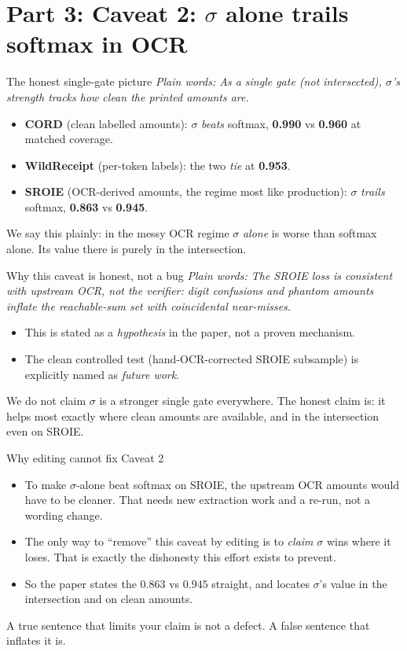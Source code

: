 \documentclass[aspectratio=169]{beamer}
\newcommand{\keybox}[1]{\begin{center}\colorbox{grey!15}{\parbox{0.92\linewidth}{\centering #1}}\end{center}}
\newcommand{\plain}[1]{\textit{\textcolor{sig}{Plain words:} #1}}
\begin{document}
\section{Part 3: Caveat 2: $\sigma$ alone trails softmax in OCR}
\begin{frame}{The honest single-gate picture}
\plain{As a \emph{single} gate (not intersected), $\sigma$'s strength
tracks how clean the printed amounts are.}
\begin{itemize}
\item \textbf{CORD} (clean labelled amounts): $\sigma$ \emph{beats}
softmax, \textbf{0.990} vs \textbf{0.960} at matched coverage.
\item \textbf{WildReceipt} (per-token labels): the two \emph{tie} at
\textbf{0.953}.
\item \textbf{SROIE} (OCR-derived amounts, the regime most like
production): $\sigma$ \textcolor{bad}{\emph{trails} softmax,
\textbf{0.863} vs \textbf{0.945}}.
\end{itemize}
\keybox{We say this plainly: in the messy OCR regime $\sigma$ \emph{alone}
is worse than softmax alone. Its value there is purely in the
intersection.}
\end{frame}

\begin{frame}{Why this caveat is honest, not a bug}
\plain{The SROIE loss is consistent with upstream OCR, not the verifier:
digit confusions and phantom amounts inflate the reachable-sum set with
coincidental near-misses.}
\begin{itemize}
\item This is stated as a \emph{hypothesis} in the paper, not a proven
mechanism.
\item The clean controlled test (hand-OCR-corrected SROIE subsample)
is explicitly named as \emph{future work}.
\end{itemize}
\keybox{We do not claim $\sigma$ is a stronger single gate everywhere.
The honest claim is: it helps most exactly where clean amounts are
available, and in the intersection even on SROIE.}
\end{frame}

\begin{frame}{Why editing cannot fix Caveat 2}
\begin{itemize}
\item To make $\sigma$-alone beat softmax on SROIE, the upstream OCR
amounts would have to be cleaner. That needs new extraction work and a
re-run, not a wording change.
\item The only way to ``remove'' this caveat by editing is to
\emph{claim} $\sigma$ wins where it loses. That is exactly the
dishonesty this effort exists to prevent.
\item So the paper states the $0.863$ vs $0.945$ straight, and locates
$\sigma$'s value in the intersection and on clean amounts.
\end{itemize}
\keybox{A true sentence that limits your claim is not a defect. A false
sentence that inflates it is.}
\end{frame}
\end{document}
